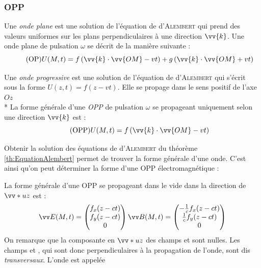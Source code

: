 \documentclass[11pt,a4paper,fleqn,pdftex]{report}
\begin{document}
\subsubsection{\acrlong{OPP}} %
\label{ssub:onde_plane}
\needspace{5cm}
\begin{dfn}
   Une \emph{onde plane} est une solution  de l'équation de d'\textsc{Alembert} qui prend des valeurs uniformes sur les plans perpendiculaires à une direction $\vv{k}$.\newline
Une onde plane de pulsation $\omega$ se décrit de la manière suivante : 
\begin{equation}\tag{OP}
U(M,t) = f \left( \vv{k}\cdot\vv{OM} - vt \right) + g \left( \vv{k}\cdot\vv{OM} + vt \right)
\end{equation}
\end{dfn}
\begin{dfn}
   Une \emph{onde progressive} est une solution de l'équation de d'\textsc{Alembert} qui s'écrit sous la forme $U(z,t) = f(z - vt)$. Elle se propage dans le sens positif de l'axe $Oz$ \\*
La forme générale d'une \emph{\gls{OPP}} de pulsation $\omega$ se propageant uniquement selon une direction $\vv{k}$ est :
\begin{equation}\tag{OPP}
U(M,t) = f \left( \vv{k}\cdot\vv{OM} - vt \right)
\end{equation}
\end{dfn}
Obtenir la solution des équations de d'\textsc{Alembert} du théorème \ref{th:EquationAlembert} permet de trouver la forme générale d'une onde. C'est ainsi qu'on peut déterminer la forme d'une \gls{OPP} électromagnétique : 
\begin{itheorem}
   La forme générale d'une \acrfull{OPP} se propageant dans le vide dans la direction de $\vv*{u}{z}$ est :
   \begin{equation}
   \E (M,t) = \begin{pmatrix}
     f_x(z-ct) \\ f_y(z-ct) \\0
   \end{pmatrix}
   \\
   \B (M,t) = \begin{pmatrix}
     -\frac{1}{c}f_x(z-ct) \\ \frac{1}{c}f_y(z-ct) \\0
   \end{pmatrix}
   \end{equation}
  On remarque que la composante en $\vv*{u}{z}$ des champs \E{} et \B{} sont nulles. Les champs \E{} et \B{}, qui sont donc perpendiculaires à la propagation de l'onde, sont dis \emph{transversaux}. L'onde est appelée 
\end{itheorem}
\end{document}
